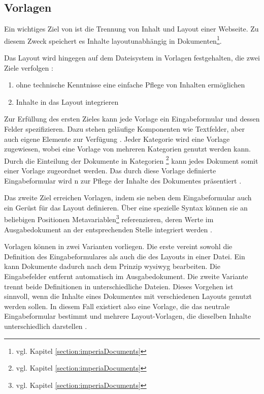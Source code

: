     \subsection{Vorlagen}
        \label{section:imperiaTemplates}
        Ein wichtiges Ziel von {\imperia} ist die Trennung von Inhalt
        und Layout einer Webseite.
        Zu diesem Zweck speichert es Inhalte layoutunabhängig
        in Dokumenten\footnote{vgl. Kapitel \ref{section:imperiaDocuments}}.

        Das Layout wird hingegen auf dem Dateisystem in Vorlagen festgehalten,
        die zwei Ziele verfolgen
        \cite[Kapitel 36]{imperia:ecmd}:

        \begin{enumerate}
            \item {\editors} ohne technische Kenntnisse eine einfache Pflege von Inhalten ermöglichen
            \item Inhalte in das Layout integrieren
        \end{enumerate}

        Zur Erfüllung des ersten Zieles kann jede Vorlage ein Eingabeformular
        und dessen Felder spezifizieren.
        Dazu stehen geläufige Komponenten wie Textfelder,
        aber auch {\imperia} eigene Elemente zur Verfügung
        \cite[Kapitel 1.1.4]{imperia:ecmd}.
        Jeder Kategorie wird eine Vorlage zugewiesen,
        wobei eine Vorlage von mehreren Kategorien genutzt werden kann.
        Durch die Einteilung der Dokumente in Kategorien
        \footnote{vgl. Kapitel \ref{section:imperiaDocuments}}
        kann jedes Dokument somit einer Vorlage zugeordnet werden.
        Das durch diese Vorlage definierte Eingabeformular
        wird {\editors n} zur Pflege der Inhalte des Dokumentes präsentiert
        \cite[Kapitel 1.1.4]{imperia:ecmd}.

        Das zweite Ziel erreichen Vorlagen,
        indem sie neben dem Eingabeformular auch ein Gerüst für das
        Layout definieren.
        Über eine spezielle Syntax können sie an beliebigen Positionen
        Metavariablen\footnote{vgl. Kapitel \ref{section:imperiaDocuments}} referenzieren,
        deren Werte im Ausgabedokument an der entsprechenden Stelle integriert werden
        \cite[Kapitel 36]{imperia:ecmd}.

        Vorlagen können in zwei Varianten vorliegen.
        Die erste vereint sowohl die Definition des Eingabeformulares
        als auch die des Layouts in einer Datei.
        Ein {\editor} kann Dokumente dadurch nach dem Prinzip \gls{wysiwyg} bearbeiten.
        Die Eingabefelder entfernt {\imperia} automatisch im Ausgabedokument.
        Die zweite Variante trennt beide Definitionen in unterschiedliche Dateien.
        Dieses Vorgehen ist sinnvoll, wenn die Inhalte eines Dokumentes mit
        verschiedenen Layouts genutzt werden sollen.
        In diesem Fall existiert also eine Vorlage,
        die das neutrale Eingabeformular bestimmt
        und mehrere Layout-Vorlagen, die dieselben Inhalte unterschiedlich darstellen
        \cite[Kapitel 36]{imperia:ecmd}.

